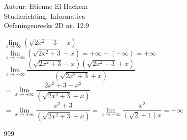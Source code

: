 \documentclass[a4paper]{article}
\begin{document}
  
\noindent \large Auteur: Etienne El Hachem \\
\noindent \large Studierichting: Informatica\\
\noindent \large Oefeningenreeks 2D nr. 12.9\\

\medskip

\normalsize

$\lim\limits_{x\rightarrow \infty} \left(\sqrt{2x^2+3} - x\right)$ \\

$\lim\limits_{x\rightarrow -\infty} \left(\sqrt{2x^2+3} - x\right) = +\infty - \left(-\infty\right) = +\infty$ \\

$\lim\limits_{x\rightarrow +\infty} \dfrac{\left(\sqrt{2x^2+3} - x\right) \left(\sqrt{2x^2+3} + x\right)}{\left(\sqrt{2x^2+3} + x\right)}$ \\
$ = \lim\limits_{x\rightarrow +\infty} \dfrac{2x^2 + 3 -x^2}{\left(\sqrt{2x^2+3} + x\right)}$ \\
$ = \lim\limits_{x\rightarrow +\infty} \dfrac{x^2 + 3}{\left(\sqrt{2x^2+3} + x\right)} = \lim\limits_{x\rightarrow +\infty} \dfrac{x^2}{(\sqrt{2} + 1)x} = +\infty$

\begin{thebibliography}{999}
\end{thebibliography}
\end{document}
